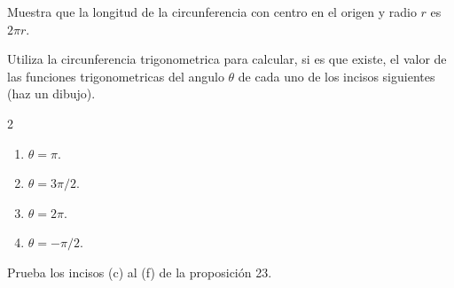 \documentclass[12pt,a4paper]{article}
\begin{document}
    \begin{mdframed}[style=mdbluebox,frametitle={Ejercicio 6}]
        Muestra que la longitud de la circunferencia con centro en el origen  y radio $r$ es $2\pi r$.
    \end{mdframed}

    \begin{mdframed}[style=mdbluebox,frametitle={Ejercicio 7}]
        Utiliza la circunferencia trigonometrica para calcular, si es que existe, el valor de las funciones trigonometricas del angulo
        $\theta$ de cada uno de los incisos siguientes (haz un dibujo).
        \begin{multicols}{2}
            \begin{enumerate}
                \item[(a)]  $\theta=\pi.$
                \item[(b)]  $\theta=3\pi/2.$
                \item[(c)]  $\theta=2\pi.$
                \item[(d)]  $\theta=-\pi/2.$
            \end{enumerate}
        \end{multicols}
    \end{mdframed}

    \begin{mdframed}[style=mdbluebox,frametitle={Ejercicio 8}]
        Prueba los incisos (c) al (f) de la proposición 23.
    \end{mdframed}
\end{document}
